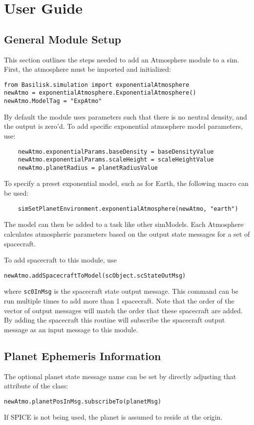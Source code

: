 
\section{User Guide}

\subsection{General Module Setup}
This section outlines the steps needed to add an Atmosphere module to a sim.
First, the atmosphere must be imported and initialized:
\begin{verbatim}
from Basilisk.simulation import exponentialAtmosphere
newAtmo = exponentialAtmosphere.ExponentialAtmosphere()
newAtmo.ModelTag = "ExpAtmo"
\end{verbatim}
By default the module uses parameters such that there is no neutral density, and the output is zero'd.  To add specific exponential atmosphere model parameters, use:
\begin{verbatim}
    newAtmo.exponentialParams.baseDensity = baseDensityValue
    newAtmo.exponentialParams.scaleHeight = scaleHeightValue
    newAtmo.planetRadius = planetRadiusValue
\end{verbatim}
To specify a preset exponential model, such as for Earth, the following macro can be used:
\begin{verbatim}
	simSetPlanetEnvironment.exponentialAtmosphere(newAtmo, "earth")
\end{verbatim}

The model can then be added to a task like other simModels. Each Atmosphere calculates atmospheric parameters based on the output state messages for a set of spacecraft.

To add spacecraft to this module, use
\begin{verbatim}
newAtmo.addSpacecraftToModel(scObject.scStateOutMsg)
\end{verbatim}
where {\tt sc0InMsg} is the spacecraft state output message.  This command can be run multiple times to add more than 1 spacecraft.  Note that the order of the vector of output messages will match the order that these spacecraft are added.  By adding the spacecraft this routine will subscribe the spacecraft output message as an input message to this module.

\subsection{Planet Ephemeris Information}
The optional planet state message name can be set by directly adjusting that attribute of the class:
\begin{verbatim}
newAtmo.planetPosInMsg.subscribeTo(planetMsg)
\end{verbatim}
If SPICE is not being used, the planet is assumed to reside at the origin.

